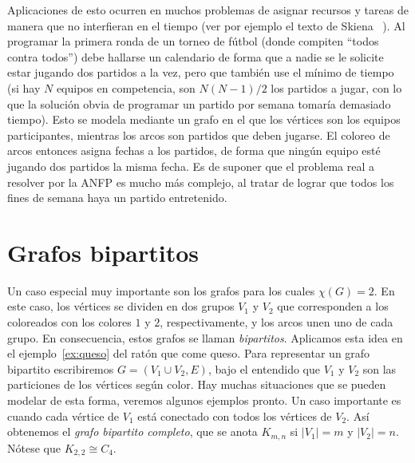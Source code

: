   Aplicaciones de esto ocurren
  en muchos problemas de asignar recursos y tareas
  de manera que no interfieran en el tiempo
  (ver por ejemplo el texto de Skiena~%
    \cite{skiena08:_algor_desig_manual}).
  Al programar la primera ronda de un torneo de fútbol
  (donde compiten ``todos contra todos'')
  debe hallarse un calendario
  de forma que a nadie se le solicite
  estar jugando dos partidos a la vez,
  pero que también use el mínimo de tiempo
  (si hay \(N\) equipos en competencia,
   son \(N (N - 1) / 2\) los partidos a jugar,
   con lo que la solución obvia de programar un partido por semana
   tomaría demasiado tiempo).
  Esto se modela mediante un grafo
  en el que los vértices son los equipos participantes,
  mientras los arcos son partidos que deben jugarse.
  El coloreo de arcos entonces asigna fechas a los partidos,
  de forma que ningún equipo
  esté jugando dos partidos la misma fecha.
  Es de suponer que el problema real a resolver por la ANFP
  es mucho más complejo,
  al tratar de lograr que todos los fines de semana
  haya un partido entretenido.

\section{Grafos bipartitos}
\label{sec:grafos-bipartitos}

  Un caso especial muy importante son los grafos
  para los cuales \(\chi(G) = 2\).
  En este caso,
  los vértices se dividen en dos grupos \(V_1\) y \(V_2\)
  que corresponden a los coloreados con los colores \(1\) y \(2\),
  respectivamente,
  y los arcos unen uno de cada grupo.
  En consecuencia,
  estos grafos se llaman \emph{bipartitos}.
  Aplicamos esta idea
  en el ejemplo~\ref{ex:queso} del ratón que come queso.
  Para representar un grafo bipartito escribiremos
  \(G = (V_1 \cup V_2, E)\),
  bajo el entendido que \(V_1\) y \(V_2\)
  son las particiones de los vértices según color.
  Hay muchas situaciones que se pueden modelar de esta forma,
  veremos algunos ejemplos pronto.
  Un caso importante es cuando cada vértice de \(V_1\)
  está conectado con todos los vértices de \(V_2\).
  Así obtenemos el \emph{grafo bipartito completo},%
  que se anota \(K_{m, n}\)
  si \(\lvert V_1 \rvert = m\) y \(\lvert V_2 \rvert = n\).
  Nótese que \(K_{2,2} \cong C_4\).

